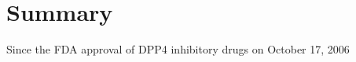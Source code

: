 \section{\label{chap:Sum} Summary}
Since the FDA approval of DPP4 inhibitory drugs on October 17, 2006

